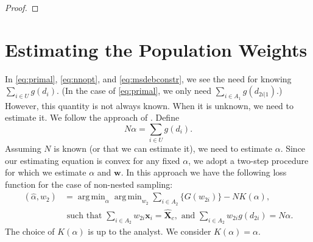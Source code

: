 \documentclass[12pt]{article}
\DeclareMathOperator*{\argmin}{arg\,min}
\renewcommand{\bf}[1]{\mathbf{#1}}
\begin{document}
\begin{proof}
\end{proof}

\section{Estimating the Population Weights}

In \eqref{eq:primal}, \eqref{eq:nnopt}, and
\eqref{eq:msdebconstr}, we see the need for knowing $\sum_{i \in U}
g(d_i)$. (In the case of \eqref{eq:primal}, we only need $\sum_{i \in
A_1} g(d_{2i|1})$.) However, this quantity is not always known. When it is
unknown, we need to estimate it.
We follow the approach of \cite{kwon2024debiased}. Define 
$$N \alpha = \sum_{i \in U} g(d_i).$$
Assuming $N$ is known (or that we can estimate it), we need to estimate
$\alpha$. Since our estimating equation is convex for any fixed $\alpha$, we
adopt a two-step procedure for which we estimate $\alpha$ and $\bf w$. In this
approach we have the following loss function for the case of non-nested sampling:
\begin{align*}
  (\hat \alpha, \hat w_2) 
  &= 
  \argmin_{\alpha} \argmin_{w_2} \sum_{i \in A_2} \{G(w_{2i})\} - NK(\alpha), \\
  &\text{ such that } \sum_{i \in A_2} w_{2i} \bf x_i = \hat{\bf X}_c,
  \text{ and } \sum_{i \in A_2} w_{2i} g(d_{2i}) = N\alpha.
\end{align*}
The choice of $K(\alpha)$ is up to the analyst. We consider $K(\alpha) =
\alpha$.
\end{document}
